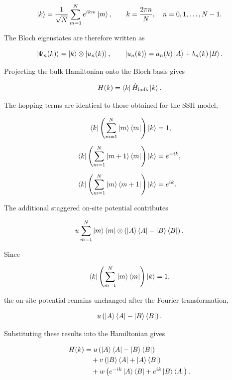 \documentclass[11pt, a4paper]{article}
\begin{document}
\begin{equation}
\ket{k}
=
\frac{1}{\sqrt{N}}
\sum_{m=1}^{N}
e^{ikm}\ket{m},
\qquad
k=\frac{2\pi n}{N},
\quad
n=0,1,\dots,N-1.
\end{equation}

The Bloch eigenstates are therefore written as

\begin{equation}
\ket{\Psi_n(k)}
=
\ket{k}\otimes\ket{u_n(k)},
\qquad
\ket{u_n(k)}
=
a_n(k)\ket{A}
+
b_n(k)\ket{B}.
\end{equation}

Projecting the bulk Hamiltonian onto the Bloch basis gives

\begin{equation*}
H(k)
=
\bra{k}\hat{H}_{\mathrm{bulk}}\ket{k}.
\end{equation*}

The hopping terms are identical to those obtained for the SSH model,

\begin{align*}
\bra{k}
\left(
\sum_{m=1}^{N}\ket{m}\bra{m}
\right)
\ket{k}
&=1,\\[2mm]
\bra{k}
\left(
\sum_{m=1}^{N}\ket{m+1}\bra{m}
\right)
\ket{k}
&=e^{-ik},\\[2mm]
\bra{k}
\left(
\sum_{m=1}^{N}\ket{m}\bra{m+1}
\right)
\ket{k}
&=e^{ik}.
\end{align*}

The additional staggered on-site potential contributes

\begin{equation*}
u
\sum_{m=1}^{N}
\ket{m}\bra{m}
\otimes
\left(
\ket{A}\bra{A}
-
\ket{B}\bra{B}
\right).
\end{equation*}

Since

\begin{equation*}
\bra{k}
\left(
\sum_{m=1}^{N}\ket{m}\bra{m}
\right)
\ket{k}
=1,
\end{equation*}

the on-site potential remains unchanged after the Fourier transformation,

\begin{equation*}
u
\left(
\ket{A}\bra{A}
-
\ket{B}\bra{B}
\right).
\end{equation*}

Substituting these results into the Hamiltonian gives

\begin{align*}
H(k)
&=
u
\left(
\ket{A}\bra{A}
-
\ket{B}\bra{B}
\right)
\\
&\quad
+
v
\left(
\ket{B}\bra{A}
+
\ket{A}\bra{B}
\right)
\\
&\quad
+
w
\left(
e^{-ik}\ket{A}\bra{B}
+
e^{ik}\ket{B}\bra{A}
\right).
\end{align*}
\end{document}
